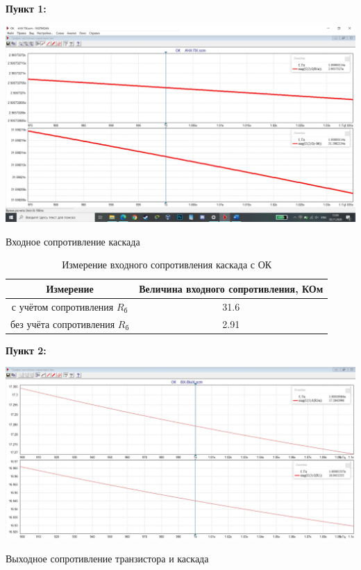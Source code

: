 \documentclass[a4paper,14pt]{extarticle}
\begin{document}
    \newpage
    \textbf{Пункт 1:}
    \begin{center}
        \includegraphics[scale=0.25]{1.jpg}
    \end{center}
    \begin{center}
        Входное сопротивление каскада 
    \end{center}
    \begin{table}[ht]
        \begin{center}
            \caption{Измерение входного сопротивления каскада с ОК}
            \begin{tabular}{ |c|c| }
                \hline
                Измерение & Величина входного сопротивления, КОм\\
                \hline
                с учётом сопротивления $R_{\text{б}}$ & 31.6\\
                \hline
                без учёта сопротивления $R_{\text{б}}$ & 2.91\\
                \hline
            \end{tabular}
        \end{center}
    \end{table}

    \newpage
    \textbf{Пункт 2:}
    \begin{center}
        \includegraphics[scale=0.25]{2.jpg}
    \end{center}
    \begin{center}
        Выходное сопротивление транзистора и каскада
    \end{center}
\end{document}
